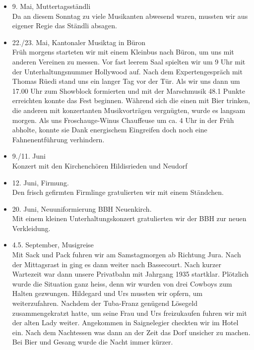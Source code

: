 \begin{history}
\begin{itemize}
        \item 9. Mai, Muttertagsständli\\
              Da an diesem Sonntag zu viele Musikanten abwesend waren, mussten wir aus
              eigener Regie das Ständli absagen.

        \item 22./23. Mai, Kantonaler Musiktag in Büron\\
              Früh morgens starteten wir mit einem Kleinbus nach Büron, um uns mit
              anderen Vereinen zu messen. Vor fast leerem Saal spielten wir um 9 Uhr
              mit der Unterhaltungsnummer Hollywood auf. Nach dem Expertengespräch mit
              Thomas Rüedi stand uns ein langer Tag vor der Tür. Als wir uns dann um
              17.00 Uhr zum Showblock formierten und mit der Marschmusik 48.1 Punkte
              erreichten konnte das Fest beginnen. Während sich die einen mit Bier
              trinken, die anderen mit konzertanten Musikvorträgen vergnügten, wurde
              es langsam morgen. Als uns Froschauge-Winus Chauffeuse um ca. 4 Uhr in
              der Früh abholte, konnte sie Dank energischem Eingreifen doch noch eine
              Fahnenentführung verhindern.

        \item 9./11. Juni\\
              Konzert mit den Kirchenchören Hildisrieden und Neudorf

        \item 12. Juni, Firmung. \\
              Den frisch gefirmten Firmlinge gratulierten wir mit einem
              Ständchen.

        \item 20. Juni, Neuuniformierung BBH Neuenkirch.\\
              Mit einem kleinen Unterhaltungskonzert gratulierten wir der BBH zur
              neuen Verkleidung.

        \item 4.5. September, Musigreise\\
              Mit Sack und Pack fuhren wir am Samstagmorgen ab Richtung Jura. Nach der
              Mittagsrast in ging es dann weiter nach Bassecourt. Nach kurzer
              Wartezeit war dann unsere Privatbahn mit Jahrgang 1935 startklar.
              Plötzlich wurde die Situation ganz heiss, denn wir wurden von drei
              Cowboys zum Halten gezwungen. Hildegard und Urs mussten wir opfern, um
              weiterzufahren. Nachdem der Tuba-Franz genügend Lösegeld
              zusammengekratzt hatte, um seine Frau und Urs freizukaufen fuhren wir
              mit der alten Lady weiter. Angekommen in Saignelegier checkten wir im
              Hotel ein. Nach dem Nachtessen was dann an der Zeit das Dorf unsicher zu
              machen. Bei Bier und Gesang wurde die Nacht immer kürzer.


\end{itemize}
\end{history}
